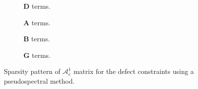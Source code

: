 

\begin{figure}[h]

\centering


\begin{subfigure}[b]{0.49\textwidth}

\vspace{-5mm}
\caption{$\bm{D}$ terms.}
\end{subfigure}
\begin{subfigure}[b]{0.49\textwidth}

\vspace{-5mm}
\caption{$\bm{A}$ terms.}
\end{subfigure}


\begin{subfigure}[b]{0.49\textwidth}

\vspace{-5mm}
\caption{$\bm{B}$ terms.}
\end{subfigure}
\begin{subfigure}[b]{0.49\textwidth}

\vspace{-5mm}
\caption{$\bm{G}$ terms.}
\end{subfigure}


\caption{Sparsity pattern of $\bm{\mathcal{A}}_e^1$ matrix for the defect constraints using a pseudospectral method.\label{fig:figsparsityAPS}}
\end{figure}